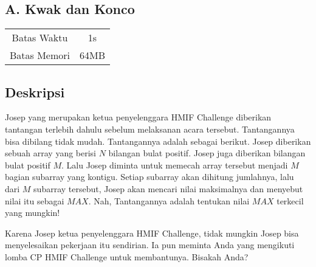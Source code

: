 \documentclass{article}
\begin{document}
\begin{center}
    \section*{A. Kwak dan Konco} %

    \begin{tabular}{ | c c | }
        \hline
        Batas Waktu  & 1s \\    %
        Batas Memori & 64MB \\  %
        \hline
    \end{tabular}
\end{center}

\subsection*{Deskripsi}



Josep yang merupakan ketua penyelenggara HMIF Challenge diberikan tantangan
terlebih dahulu sebelum melaksanan acara tersebut. Tantangannya bisa dibilang tidak mudah. Tantangannya adalah sebagai berikut. 
Josep diberikan sebuah array yang berisi $N$ bilangan bulat positif. Josep juga diberikan bilangan bulat positif $M$. Lalu Josep diminta untuk memecah
array tersebut menjadi $M$ bagian subarray yang kontigu. Setiap subarray akan dihitung jumlahnya, lalu dari $M$ subarray tersebut, Josep akan mencari nilai
maksimalnya dan menyebut nilai itu sebagai $MAX$. Nah, Tantangannya adalah tentukan nilai $MAX$ terkecil yang mungkin!

Karena Josep ketua penyelenggara HMIF Challenge, tidak mungkin Josep bisa menyelesaikan pekerjaan itu sendirian. Ia pun meminta Anda yang mengikuti lomba CP HMIF Challenge
untuk membantunya. Bisakah Anda?


\end{document}
